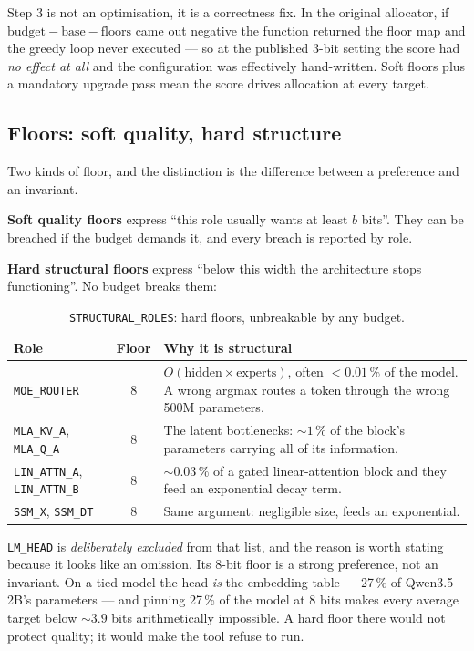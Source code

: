 \documentclass[11pt]{article}
\newcommand{\pct}{\,\%}
\newcommand{\code}[1]{\texttt{#1}}
\begin{document}
Step 3 is not an optimisation, it is a correctness fix. In the original allocator, if
$\text{budget} - \text{base} - \text{floors}$ came out negative the function returned the floor
map and the greedy loop never executed --- so at the published 3-bit setting the score had
\emph{no effect at all} and the configuration was effectively hand-written. Soft floors plus a
mandatory upgrade pass mean the score drives allocation at every target.

\subsection{Floors: soft quality, hard structure}

Two kinds of floor, and the distinction is the difference between a preference and an invariant.

\textbf{Soft quality floors} express ``this role usually wants at least $b$ bits''. They can be
breached if the budget demands it, and every breach is reported by role.

\textbf{Hard structural floors} express ``below this width the architecture stops functioning''.
No budget breaks them:

\begin{table}[H]
\centering\small
\caption{\code{STRUCTURAL\_ROLES}: hard floors, unbreakable by any budget.}
\begin{tabular}{p{}cp{}}
\toprule
Role & Floor & Why it is structural \\
\midrule
\code{MOE\_ROUTER} & 8 & $O(\text{hidden}\times\text{experts})$, often $<0.01\pct$ of the model. A
wrong argmax routes a token through the wrong 500M parameters. \\
\rowcolor{rowtint}
\code{MLA\_KV\_A}, \code{MLA\_Q\_A} & 8 & The latent bottlenecks: ${\sim}1\pct$ of the block's
parameters carrying all of its information. \\
\code{LIN\_ATTN\_A}, \code{LIN\_ATTN\_B} & 8 & ${\sim}0.03\pct$ of a gated linear-attention block
and they feed an exponential decay term. \\
\rowcolor{rowtint}
\code{SSM\_X}, \code{SSM\_DT} & 8 & Same argument: negligible size, feeds an exponential. \\
\bottomrule
\end{tabular}
\end{table}

\code{LM\_HEAD} is \emph{deliberately excluded} from that list, and the reason is worth stating
because it looks like an omission. Its 8-bit floor is a strong preference, not an invariant. On a
tied model the head \emph{is} the embedding table --- 27\pct{} of Qwen3.5-2B's parameters ---
and pinning 27\pct{} of the model at 8 bits makes every average target below ${\sim}3.9$ bits
arithmetically impossible. A hard floor there would not protect quality; it would make the tool
refuse to run.
\end{document}
